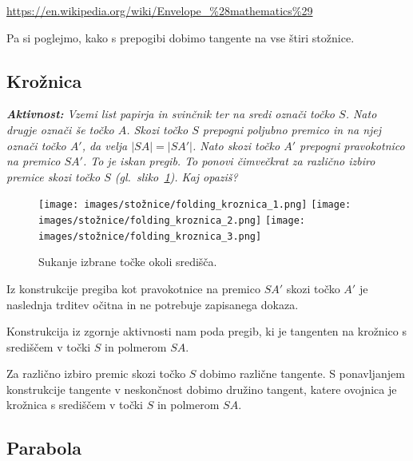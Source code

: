 \url{https://en.wikipedia.org/wiki/Envelope_%28mathematics%29}



Pa si poglejmo, kako s prepogibi dobimo tangente na vse štiri stožnice.

\subsection{Krožnica}


\textit{\textbf{Aktivnost:} Vzemi list papirja in svinčnik ter na sredi označi točko $S$. Nato drugje označi še točko $A$. Skozi točko $S$ prepogni poljubno premico in na njej označi točko $A'$, da velja $|SA| = |SA'|$. Nato skozi točko $A'$ prepogni pravokotnico na premico $SA'$. To je iskan pregib. To ponovi čimvečkrat za različno izbiro premice skozi točko $S$ (gl.\ sliko~\ref{fig:koraki_kroznica}). Kaj opaziš?}

\begin{figure}[h]
    \centering
    \texttt{[image: images/stožnice/folding\_kroznica\_1.png]}
    \texttt{[image: images/stožnice/folding\_kroznica\_2.png]}
    \texttt{[image: images/stožnice/folding\_kroznica\_3.png]}
    \caption[Prepogibanje krožnice]{Sukanje izbrane točke okoli središča.}
    \label{fig:koraki_kroznica}
\end{figure}


Iz konstrukcije pregiba kot pravokotnice na premico $SA'$ skozi točko $A'$ je naslednja trditev očitna in ne potrebuje zapisanega dokaza.

\begin{trditev}
    Konstrukcija iz zgornje aktivnosti nam poda pregib, ki je tangenten na krožnico s središčem v točki $S$ in polmerom $SA$.
\end{trditev}

Za različno izbiro premic skozi točko $S$ dobimo različne tangente. S ponavljanjem konstrukcije tangente v neskončnost dobimo družino tangent, katere ovojnica je krožnica s središčem v točki $S$ in polmerom $SA$.

\subsection{Parabola}

